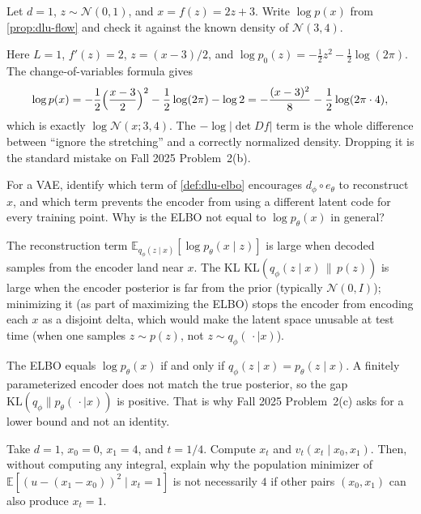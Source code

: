 \begin{exercise}
\label{ex:dlu-flow-1}
Let \(d=1\), \(z\sim\mathcal{N}(0,1)\), and \(x=f(z)=2z+3\). Write \(\log p(x)\) from \cref{prop:dlu-flow} and check it against the known density of \(\mathcal{N}(3,4)\).
\end{exercise}

\begin{solution}
Here \(L=1\), \(f'(z)=2\), \(z=(x-3)/2\), and \(\log p_0(z)=-\frac12 z^2-\frac12\log(2\pi)\). The change-of-variables formula gives
\[
\log p(x)
=
-\frac12\Bigl(\frac{x-3}{2}\Bigr)^2
-\frac12\log(2\pi)
-\log 2
=
-\frac{(x-3)^2}{8}
-\frac12\log(2\pi\cdot 4),
\]
which is exactly \(\log\mathcal{N}(x;3,4)\). The \(-\log\lvert\det Df\rvert\) term is the whole difference between ``ignore the stretching'' and a correctly normalized density. Dropping it is the standard mistake on Fall 2025 Problem~2(b).
\end{solution}

\begin{exercise}
\label{ex:dlu-elbo-words}
For a VAE, identify which term of \cref{def:dlu-elbo} encourages \(d_\phi\circ e_\theta\) to reconstruct \(x\), and which term prevents the encoder from using a different latent code for every training point. Why is the ELBO not equal to \(\log p_\theta(x)\) in general?
\end{exercise}

\begin{solution}
The reconstruction term \(\mathbb{E}_{q_\phi(z\mid x)}[\log p_\theta(x\mid z)]\) is large when decoded samples from the encoder land near \(x\). The KL \(\mathrm{KL}(q_\phi(z\mid x)\,\|\,p(z))\) is large when the encoder posterior is far from the prior (typically \(\mathcal{N}(0,I)\)); minimizing it (as part of maximizing the ELBO) stops the encoder from encoding each \(x\) as a disjoint delta, which would make the latent space unusable at test time (when one samples \(z\sim p(z)\), not \(z\sim q_\phi(\,\cdot\mid x)\)).

The ELBO equals \(\log p_\theta(x)\) if and only if \(q_\phi(z\mid x)=p_\theta(z\mid x)\). A finitely parameterized encoder does not match the true posterior, so the gap \(\mathrm{KL}(q_\phi\|p_\theta(\,\cdot\mid x))\) is positive. That is why Fall 2025 Problem~2(c) asks for a lower bound and not an identity.
\end{solution}

\begin{exercise}
\label{ex:dlu-cfm-num}
Take \(d=1\), \(x_0=0\), \(x_1=4\), and \(t=1/4\). Compute \(x_t\) and \(v_t(x_t\mid x_0,x_1)\). Then, without computing any integral, explain why the population minimizer of \(\mathbb{E}[(u-(x_1-x_0))^2\mid x_t=1]\) is not necessarily \(4\) if other pairs \((x_0,x_1)\) can also produce \(x_t=1\).
\end{exercise}

